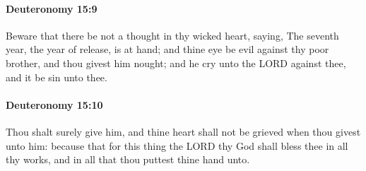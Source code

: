 		\paragraph{Deuteronomy 15:9} %
			\label{DEUTERONOMY-15-9}

			Beware that there be not a thought in thy wicked heart, saying, The seventh year, the year of release, is at hand; and thine eye be evil against thy poor brother, and thou givest him nought; and he cry unto the LORD against thee, and it be sin unto thee.


		\paragraph{Deuteronomy 15:10} %
			\label{DEUTERONOMY-15-10}

			Thou shalt surely give him, and thine heart shall not be grieved when thou givest unto him: because that for this thing the LORD thy God shall bless thee in all thy works, and in all that thou puttest thine hand unto.

